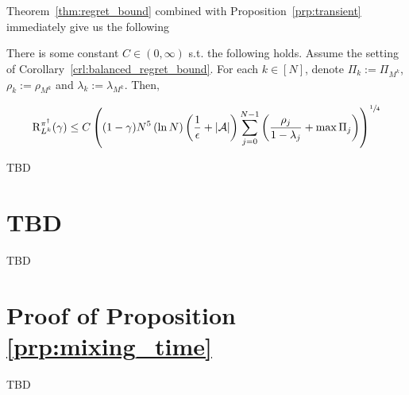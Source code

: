 \documentclass[anon,12pt]{colt2018} %
\newcommand{\AP}[1]{\left(#1\right)}
\newcommand{\Abs}[1]{\left\vert #1 \right\vert}
\newcommand{\A}{\mathcal{A}}
\newcommand{\Rg}{\operatorname{R}}
\begin{document}
Theorem~\ref{thm:regret_bound} combined with Proposition~\ref{prp:transient} immediately give us the following

\begin{samepage}
\begin{corollary}
\label{crl:regret_bound_mixing}

There is some constant $C \in (0,\infty)$ s.t. the following holds. Assume the setting of Corollary~\ref{crl:balanced_regret_bound}. For each $k \in [N]$, denote $\Pi_k:=\Pi_{M^k}$, $\rho_k:=\rho_{M^k}$ and $\lambda_k:=\lambda_{M^k}$. Then,

\begin{equation}
\Rg_{L^k}^{\pi^\dagger}(\gamma)\leq C\AP{(1-\gamma)N^5 \AP{\ln N} \AP{\frac{1}{\epsilon}+\Abs{\A}}\sum_{j=0}^{N-1} \AP{\frac{\rho_j}{1-\lambda_j}+\max{\Pi_j}}}^{\sfrac{1}{4}}
\end{equation}



\end{corollary}
\end{samepage}

TBD

\section{TBD}

TBD

\section{Proof of Proposition \ref{prp:mixing_time}}
\label{sec:proof__prp__mixing_time}

TBD
\end{document}
